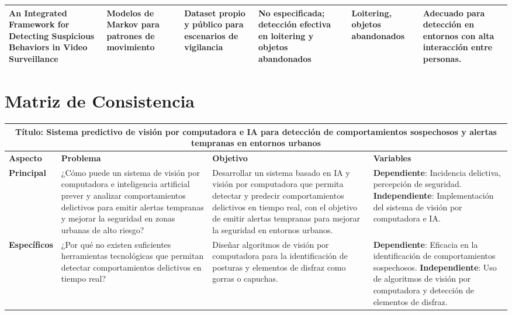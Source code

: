 \documentclass[listof=nochaptergap,12pt,times,authoryear]{report}
\begin{document}
\begin{landscape}
\begin{longtable}{|p{5cm}|p{4cm}|p{3cm}|p{2cm}|p{3cm}|p{5cm}|}
    An Integrated Framework for Detecting Suspicious Behaviors in Video Surveillance & Modelos de Markov para patrones de movimiento & Dataset propio y público para escenarios de vigilancia & No especificada; detección efectiva en loitering y objetos abandonados & Loitering, objetos abandonados & Adecuado para detección en entornos con alta interacción entre personas. \\ \hline
\end{longtable}
\end{landscape}



\section{Matriz de Consistencia}
\begin{landscape}
\begin{longtable}{| m{4cm} | m{7cm} | m{7cm} | m{7cm} |}
    \hline
    \multicolumn{4}{|c|}{\textbf{Título: Sistema predictivo de visión por computadora e IA para detección de comportamientos sospechosos y alertas tempranas en entornos urbanos}} \\ \hline
    \textbf{Aspecto} & \textbf{Problema} & \textbf{Objetivo} & \textbf{Variables} \\ \hline
    
    \textbf{Principal} & ¿Cómo puede un sistema de visión por computadora e inteligencia artificial prever y analizar comportamientos delictivos para emitir alertas tempranas y mejorar la seguridad en zonas urbanas de alto riesgo? & Desarrollar un sistema basado en IA y visión por computadora que permita detectar y predecir comportamientos delictivos en tiempo real, con el objetivo de emitir alertas tempranas para mejorar la seguridad en entornos urbanos. & \textbf{Dependiente}: Incidencia delictiva, percepción de seguridad. \newline \textbf{Independiente}: Implementación del sistema de visión por computadora e IA. \\ \hline
    
    \textbf{Específicos} & ¿Por qué no existen suficientes herramientas tecnológicas que permitan detectar comportamientos delictivos en tiempo real? & Diseñar algoritmos de visión por computadora para la identificación de posturas y elementos de disfraz como gorras o capuchas. & \textbf{Dependiente}: Eficacia en la identificación de comportamientos sospechosos. \newline \textbf{Independiente}: Uso de algoritmos de visión por computadora y detección de elementos de disfraz. \\ \hline
    

\end{longtable}
\end{landscape}
\end{document}
